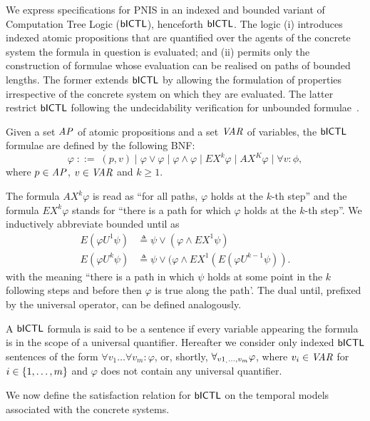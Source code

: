 We express specifications for PNIS in an indexed and bounded variant of
Computation Tree Logic ($\sf{bICTL}$), henceforth $\sf{bICTL}$. The logic (i) introduces
indexed atomic propositions that are quantified over the agents of the concrete
system the formula in question is evaluated; and (ii) permits only the
construction of formulae whose evaluation can be realised on paths of bounded
lengths. The former extends $\sf{bICTL}$ by allowing the formulation of properties
irrespective of the concrete system on which they are evaluated.  The latter
restrict $\sf{bICTL}$ following the undecidability verification for unbounded
formulae~\cite{Akintunde+20}.

\begin{definition}
Given a  set $\it{AP}$ of atomic propositions and a set $\it{VAR}$ of variables,
the $\sf{bICTL}$  formulae are defined by the following BNF:
\[
  \varphi \;   ::= \; (p, v) \mid \varphi \lor \varphi \mid \varphi \land \varphi
  \mid EX^k \varphi \mid AX^K \varphi \mid \forall v : \phi,
\]
where  $p \in \it{AP}$, $v \in \it{VAR}$ and $k \geq  1$.
\end{definition}

The formula $AX^k \varphi$ is read as ``for all paths, $\varphi$ holds at the
$k$-th step'' and the formula $EX^k \varphi$ stands for ``there is a path for
which $\varphi$ holds at the $k$-th step''. We inductively abbreviate bounded until as
\begin{align*}
 E(\varphi U^1 \psi) &\triangleq \psi \lor (\varphi \land EX^1 \psi) \\
 E(\varphi U^k \psi) &\triangleq \psi \lor (\varphi \land EX^1 (E (\varphi U^{k-1} \psi)).
\end{align*}
with the meaning ``there is a path in which $\psi$ holds at some point in the
$k$ following steps and before then $\varphi$ is true along the path'. The dual
until, prefixed by the universal operator, can be defined analogously.

A $\sf{bICTL}$ formula is said to be a sentence if every variable appearing the
formula is in the scope of a universal quantifier. Hereafter we consider only
indexed $\sf{bICTL}$ sentences of the form $\forall v_1 \ldots \forall v_m :
\varphi$, or, shortly, $\forall_{v1_,\ldots,v_m} \varphi$, where $v_i \in \it{VAR}$ for $i \in
\left \{ 1,\ldots,m \right \}$ and $\varphi$ does not contain any universal quantifier.

We now define the satisfaction relation for $\sf{bICTL}$ on the temporal models
associated with the concrete systems.

